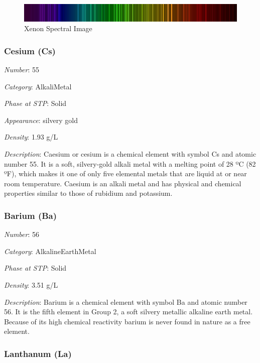 \documentclass{article}
\begin{document}
\immediate{}
\begin{figure}[!ht]
    \centering
    \includegraphics[width=12cm]{./resources/spectral_img/Xenon_Spectrum.jpg}
    \caption{Xenon Spectral Image}
\end{figure}

\hypertarget{subsubsection::Cs}{}\subsubsection{Cesium (Cs)}

\textit{Number}: 55

\textit{Category}: AlkaliMetal

\textit{Phase at STP}: Solid

\textit{Appearance}: silvery gold

\textit{Density}: 1.93 g/L

\textit{Description}: Caesium or cesium is a chemical element with symbol Cs and atomic number 55. It is a soft, silvery-gold alkali metal with a melting point of 28 ºC (82 ºF), which makes it one of only five elemental metals that are liquid at or near room temperature. Caesium is an alkali metal and has physical and chemical properties similar to those of rubidium and potassium.

\hypertarget{subsubsection::Ba}{}\subsubsection{Barium (Ba)}

\textit{Number}: 56

\textit{Category}: AlkalineEarthMetal

\textit{Phase at STP}: Solid

\textit{Density}: 3.51 g/L

\textit{Description}: Barium is a chemical element with symbol Ba and atomic number 56. It is the fifth element in Group 2, a soft silvery metallic alkaline earth metal. Because of its high chemical reactivity barium is never found in nature as a free element.

\hypertarget{subsubsection::La}{}\subsubsection{Lanthanum (La)}
\end{document}
